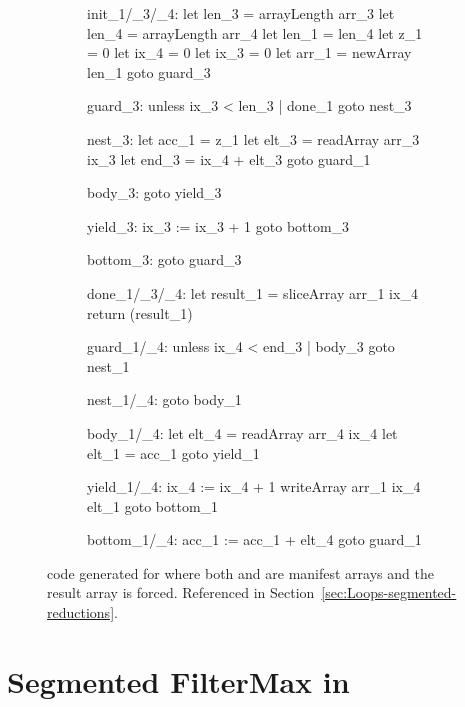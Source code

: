 \documentclass[preamble.tex]{subfiles}
\begin{document}
\begin{figure}[ht!]

\begin{subfigure}{.55\textwidth}
\begin{loopcode}[%
  literate=
    {_1}{{\sub{scan}}}3
    {_3}{{\sub{segd}}}3
    {_4}{{\sub{data}}}3,
]
init_1/_3/_4:
  let len_3 = arrayLength arr_3
  let len_4 = arrayLength arr_4
  let len_1 = len_4
  let z_1 = 0
  let ix_4 = 0
  let ix_3 = 0
  let arr_1 = newArray len_1
  goto guard_3

guard_3:
  unless ix_3 < len_3 | done_1
  goto nest_3

nest_3:
  let acc_1 = z_1
  let elt_3 = readArray arr_3 ix_3
  let end_3 = ix_4 + elt_3
  goto guard_1

body_3:
  goto yield_3

yield_3:
  ix_3 := ix_3 + 1
  goto bottom_3

bottom_3:
  goto guard_3

done_1/_3/_4:
  let result_1 = sliceArray arr_1 ix_4
  return (result_1)
\end{loopcode}
\end{subfigure}%
%
\begin{subfigure}{.45\textwidth}
\begin{loopcode}[%
  literate=
    {_1}{{\sub{scan}}}3
    {_3}{{\sub{segd}}}3
    {_4}{{\sub{data}}}3,
]
guard_1/_4:
  unless ix_4 < end_3 | body_3
  goto nest_1

nest_1/_4:
  goto body_1

body_1/_4:
  let elt_4 = readArray arr_4 ix_4
  let elt_1 = acc_1
  goto yield_1

yield_1/_4:
  ix_4 := ix_4 + 1
  writeArray arr_1 ix_4 elt_1
  goto bottom_1

bottom_1/_4:
  acc_1 := acc_1 + elt_4
  goto guard_1
\end{loopcode}
\end{subfigure}

\caption{\Loop code generated for  where both  and  are manifest arrays and the result array is forced. Referenced in Section~\protect\ref{sec:Loops-segmented-reductions}.}
\label{fig:Loop-scanl-s-complete}
\end{figure}


\clearpage
\section*{Segmented FilterMax in \LiveFusion}
\label{sec:FilterMax-implementation}
\end{document}
